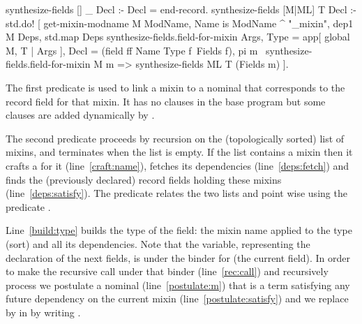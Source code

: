 \documentclass[a4paper,UKenglish,cleveref, autoref]{lipics-v2019}
\newcommand{\mixin}{mixin}
\newcommand{\mixins}{mixins}
\theoremstyle{implem}
\theoremstyle{implem}
\theoremstyle{command}
\begin{document}
{{\begin{elpicode}
synthesize-fields [] _ Decl :- Decl = end-record.
synthesize-fields [M|ML] T Decl :- std.do! [
  get-mixin-modname M ModName, Name is ModName ^ "_mixin",                          %
  dep1 M Deps,                                         %
  std.map Deps synthesize-fields.field-for-mixin Args, %
  Type = app[ global M, T | Args ],                    %
  Decl = (field ff Name Type f\ Fields f),
  pi m\                                                %
    synthesize-fields.field-for-mixin M m =>           %
    synthesize-fields ML T (Fields m)                  %
].
\end{elpicode}

The first predicate  is used
to link a \mixin{} to a nominal that corresponds to the record field
for that mixin. It has no clauses in the base program but some clauses
are added dynamically by .

The second predicate proceeds by recursion on the (topologically sorted) list of \mixins{},
and terminates when the list is empty. If the list contains a \mixin{} 
then it crafts a  for it (line~\ref{craft:name}),
fetches its dependencies (line~\ref{deps:fetch}) and
finds the (previously declared) record fields holding these \mixins{}
(line~\ref{deps:satisfy}).
The  predicate relates the two lists  and
 point wise using the predicate .

Line~\ref{build:type} builds the type of the field: the \mixin{} name applied
to the type (sort) and all its dependencies.
Note that the  variable, representing the declaration of the
next fields, is under the binder for  (the current field).
In order to make the recursive call under that binder (line~\ref{rec:call})
and recursively process  we postulate a nominal
 (line~\ref{postulate:m}) that is a term satisfying any
future dependency on the current \mixin{} (line~\ref{postulate:satisfy})
and we replace  by  in  by writing
.


}}
\end{document}
